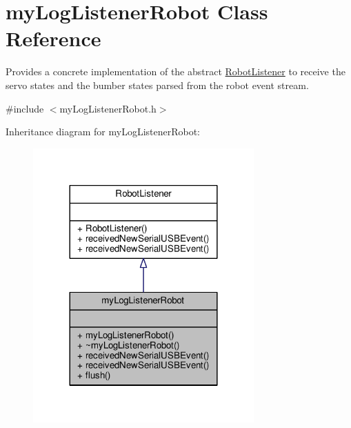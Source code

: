 \hypertarget{classmy_log_listener_robot}{}\section{my\+Log\+Listener\+Robot Class Reference}
\label{classmy_log_listener_robot}


Provides a concrete implementation of the abstract \hyperlink{class_robot_listener}{Robot\+Listener} to receive the servo states and the bumber states parsed from the robot event stream.  




{\ttfamily \#include $<$my\+Log\+Listener\+Robot.\+h$>$}



Inheritance diagram for my\+Log\+Listener\+Robot\+:
\nopagebreak
\begin{figure}[H]
\begin{center}
\leavevmode
\includegraphics[width=240pt]{classmy_log_listener_robot__inherit__graph}
\end{center}
\end{figure}


